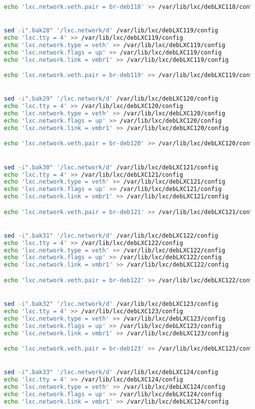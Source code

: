 \documentclass[french]{article}
\begin{document}
\begin{lstlisting}[language=bash,caption={}]
echo 'lxc.network.veth.pair = br-deb118' >> /var/lib/lxc/debLXC118/config


sed -i".bak28" '/lxc.network/d' /var/lib/lxc/debLXC119/config
echo 'lxc.tty = 4' >> /var/lib/lxc/debLXC119/config
echo 'lxc.network.type = veth' >> /var/lib/lxc/debLXC119/config
echo 'lxc.network.flags = up' >> /var/lib/lxc/debLXC119/config
echo 'lxc.network.link = vmbr1' >> /var/lib/lxc/debLXC119/config

echo 'lxc.network.veth.pair = br-deb119' >> /var/lib/lxc/debLXC119/config


sed -i".bak29" '/lxc.network/d' /var/lib/lxc/debLXC120/config
echo 'lxc.tty = 4' >> /var/lib/lxc/debLXC120/config
echo 'lxc.network.type = veth' >> /var/lib/lxc/debLXC120/config
echo 'lxc.network.flags = up' >> /var/lib/lxc/debLXC120/config
echo 'lxc.network.link = vmbr1' >> /var/lib/lxc/debLXC120/config

echo 'lxc.network.veth.pair = br-deb120' >> /var/lib/lxc/debLXC120/config


sed -i".bak30" '/lxc.network/d' /var/lib/lxc/debLXC121/config
echo 'lxc.tty = 4' >> /var/lib/lxc/debLXC121/config
echo 'lxc.network.type = veth' >> /var/lib/lxc/debLXC121/config
echo 'lxc.network.flags = up' >> /var/lib/lxc/debLXC121/config
echo 'lxc.network.link = vmbr1' >> /var/lib/lxc/debLXC121/config

echo 'lxc.network.veth.pair = br-deb121' >> /var/lib/lxc/debLXC121/config


sed -i".bak31" '/lxc.network/d' /var/lib/lxc/debLXC122/config
echo 'lxc.tty = 4' >> /var/lib/lxc/debLXC122/config
echo 'lxc.network.type = veth' >> /var/lib/lxc/debLXC122/config
echo 'lxc.network.flags = up' >> /var/lib/lxc/debLXC122/config
echo 'lxc.network.link = vmbr1' >> /var/lib/lxc/debLXC122/config

echo 'lxc.network.veth.pair = br-deb122' >> /var/lib/lxc/debLXC122/config


sed -i".bak32" '/lxc.network/d' /var/lib/lxc/debLXC123/config
echo 'lxc.tty = 4' >> /var/lib/lxc/debLXC123/config
echo 'lxc.network.type = veth' >> /var/lib/lxc/debLXC123/config
echo 'lxc.network.flags = up' >> /var/lib/lxc/debLXC123/config
echo 'lxc.network.link = vmbr1' >> /var/lib/lxc/debLXC123/config

echo 'lxc.network.veth.pair = br-deb123' >> /var/lib/lxc/debLXC123/config


sed -i".bak33" '/lxc.network/d' /var/lib/lxc/debLXC124/config
echo 'lxc.tty = 4' >> /var/lib/lxc/debLXC124/config
echo 'lxc.network.type = veth' >> /var/lib/lxc/debLXC124/config
echo 'lxc.network.flags = up' >> /var/lib/lxc/debLXC124/config
echo 'lxc.network.link = vmbr1' >> /var/lib/lxc/debLXC124/config


\end{lstlisting}
\end{document}
